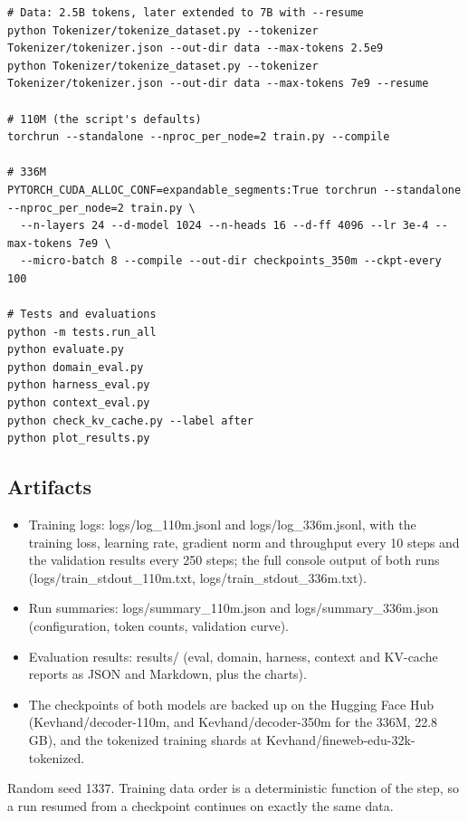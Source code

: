 \documentclass[11pt]{article}
\begin{document}
\begin{Verbatim}[fontsize=\footnotesize,frame=leftline,framesep=8pt,breaklines,breakanywhere=false,breaksymbolleft={}]
# Data: 2.5B tokens, later extended to 7B with --resume
python Tokenizer/tokenize_dataset.py --tokenizer Tokenizer/tokenizer.json --out-dir data --max-tokens 2.5e9
python Tokenizer/tokenize_dataset.py --tokenizer Tokenizer/tokenizer.json --out-dir data --max-tokens 7e9 --resume

# 110M (the script's defaults)
torchrun --standalone --nproc_per_node=2 train.py --compile

# 336M
PYTORCH_CUDA_ALLOC_CONF=expandable_segments:True torchrun --standalone --nproc_per_node=2 train.py \
  --n-layers 24 --d-model 1024 --n-heads 16 --d-ff 4096 --lr 3e-4 --max-tokens 7e9 \
  --micro-batch 8 --compile --out-dir checkpoints_350m --ckpt-every 100

# Tests and evaluations
python -m tests.run_all
python evaluate.py
python domain_eval.py
python harness_eval.py
python context_eval.py
python check_kv_cache.py --label after
python plot_results.py
\end{Verbatim}

\subsection{Artifacts}

\begin{itemize}
\item Training logs: logs/\allowbreak{}log\_\allowbreak{}110m.jsonl and logs/\allowbreak{}log\_\allowbreak{}336m.jsonl, with the training loss, learning rate, gradient norm and throughput every 10 steps and the validation results every 250 steps; the full console output of both runs (logs/\allowbreak{}train\_\allowbreak{}stdout\_\allowbreak{}110m.txt, logs/\allowbreak{}train\_\allowbreak{}stdout\_\allowbreak{}336m.txt).
\item Run summaries: logs/\allowbreak{}summary\_\allowbreak{}110m.json and logs/\allowbreak{}summary\_\allowbreak{}336m.json (configuration, token counts, validation curve).
\item Evaluation results: results/\allowbreak{} (eval, domain, harness, context and KV-cache reports as JSON and Markdown, plus the charts).
\item The checkpoints of both models are backed up on the Hugging Face Hub (Kevhand/\allowbreak{}decoder-110m, and Kevhand/\allowbreak{}decoder-350m for the 336M, 22.8 GB), and the tokenized training shards at Kevhand/\allowbreak{}fineweb-edu-32k-tokenized.
\end{itemize}

Random seed 1337. Training data order is a deterministic function of the step, so a run resumed from a checkpoint continues on exactly the same data.




\end{document}
